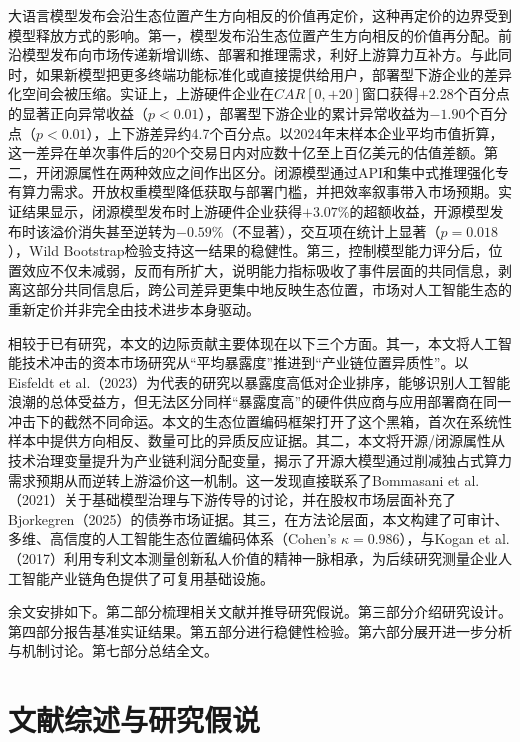 \documentclass[11pt,fontset=fandol,a4paper]{ctexart}
\newcommand{\changed}[1]{#1}
\begin{document}
\changed{大语言模型发布会沿生态位置产生方向相反的价值再定价，这种再定价的边界受到模型释放方式的影响。第一，模型发布沿生态位置产生方向相反的价值再分配。前沿模型发布向市场传递新增训练、部署和推理需求，利好上游算力互补方。与此同时，如果新模型把更多终端功能标准化或直接提供给用户，部署型下游企业的差异化空间会被压缩。实证上，上游硬件企业在$CAR[0,+20]$窗口获得$+2.28$个百分点的显著正向异常收益（$p<0.01$），部署型下游企业的累计异常收益为$-1.90$个百分点（$p<0.01$），上下游差异约4.7个百分点。以2024年末样本企业平均市值折算，这一差异在单次事件后的20个交易日内对应数十亿至上百亿美元的估值差额。第二，开闭源属性在两种效应之间作出区分。闭源模型通过API和集中式推理强化专有算力需求。开放权重模型降低获取与部署门槛，并把效率叙事带入市场预期。实证结果显示，闭源模型发布时上游硬件企业获得$+3.07\%$的超额收益，开源模型发布时该溢价消失甚至逆转为$-0.59\%$（不显著），交互项在统计上显著（$p=0.018$），Wild Bootstrap检验支持这一结果的稳健性。第三，控制模型能力评分后，位置效应不仅未减弱，反而有所扩大，说明能力指标吸收了事件层面的共同信息，剥离这部分共同信息后，跨公司差异更集中地反映生态位置，市场对人工智能生态的重新定价并非完全由技术进步本身驱动。}

\changed{相较于已有研究，本文的边际贡献主要体现在以下三个方面。其一，本文将人工智能技术冲击的资本市场研究从“平均暴露度”推进到“产业链位置异质性”。以Eisfeldt et al.（2023）为代表的研究以暴露度高低对企业排序，能够识别人工智能浪潮的总体受益方，但无法区分同样“暴露度高”的硬件供应商与应用部署商在同一冲击下的截然不同命运。本文的生态位置编码框架打开了这个黑箱，首次在系统性样本中提供方向相反、数量可比的异质反应证据。其二，本文将开源/闭源属性从技术治理变量提升为产业链利润分配变量，揭示了开源大模型通过削减独占式算力需求预期从而逆转上游溢价这一机制。这一发现直接联系了Bommasani et al.（2021）关于基础模型治理与下游传导的讨论，并在股权市场层面补充了Bjorkegren（2025）的债券市场证据。其三，在方法论层面，本文构建了可审计、多维、高信度的人工智能生态位置编码体系（Cohen's $\kappa=0.986$），与Kogan et al.（2017）利用专利文本测量创新私人价值的精神一脉相承，为后续研究测量企业人工智能产业链角色提供了可复用基础设施。}

\changed{余文安排如下。第二部分梳理相关文献并推导研究假说。第三部分介绍研究设计。第四部分报告基准实证结果。第五部分进行稳健性检验。第六部分展开进一步分析与机制讨论。第七部分总结全文。}


\section{文献综述与研究假说}
\end{document}
